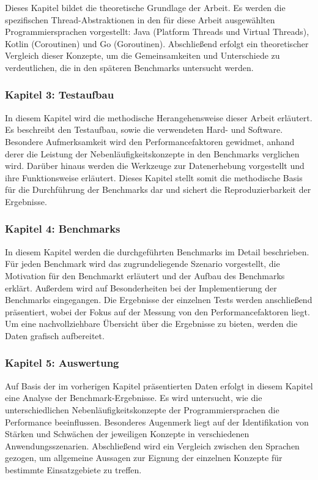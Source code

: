 \documentclass[fontsize=12pt,paper=a4,twoside=semi,parskip=half-,headsepline,headinclude]{scrreprt}
\begin{document}
Dieses Kapitel bildet die theoretische Grundlage der Arbeit. Es werden die spezifischen Thread-Abstraktionen in den für diese Arbeit ausgewählten Programmiersprachen vorgestellt: Java (Platform Threads und Virtual Threads), Kotlin (Coroutinen) und Go (Goroutinen). Abschließend erfolgt ein theoretischer Vergleich dieser Konzepte, um die Gemeinsamkeiten und Unterschiede zu verdeutlichen, die in den späteren Benchmarks untersucht werden.

\subsubsection{Kapitel 3: Testaufbau}

In diesem Kapitel wird die methodische Herangehensweise dieser Arbeit erläutert. Es beschreibt den Testaufbau, sowie die verwendeten Hard- und Software. Besondere Aufmerksamkeit wird den Performancefaktoren gewidmet, anhand derer die Leistung der Nebenläufigkeitskonzepte in den Benchmarks verglichen wird. Darüber hinaus werden die Werkzeuge zur Datenerhebung vorgestellt und ihre Funktionsweise erläutert. Dieses Kapitel stellt somit die methodische Basis für die Durchführung der Benchmarks dar und sichert die Reproduzierbarkeit der Ergebnisse.

\subsubsection{Kapitel 4: Benchmarks}

In diesem Kapitel werden die durchgeführten Benchmarks im Detail beschrieben. Für jeden Benchmark wird das zugrundeliegende Szenario vorgestellt, die Motivation für den Benchmarkt erläutert und der Aufbau des Benchmarks erklärt. Außerdem wird auf Besonderheiten bei der Implementierung der Benchmarks eingegangen. Die Ergebnisse der einzelnen Tests werden anschließend präsentiert, wobei der Fokus auf der Messung von den Performancefaktoren liegt. Um eine nachvollziehbare Übersicht über die Ergebnisse zu bieten, werden die Daten grafisch aufbereitet.

\subsubsection{Kapitel 5: Auswertung}

Auf Basis der im vorherigen Kapitel präsentierten Daten erfolgt in diesem Kapitel eine Analyse der Benchmark-Ergebnisse. Es wird untersucht, wie die unterschiedlichen Nebenläufigkeitskonzepte der Programmiersprachen die Performance beeinflussen. Besonderes Augenmerk liegt auf der Identifikation von Stärken und Schwächen der jeweiligen Konzepte in verschiedenen Anwendungsszenarien. Abschließend wird ein Vergleich zwischen den Sprachen gezogen, um allgemeine Aussagen zur Eignung der einzelnen Konzepte für bestimmte Einsatzgebiete zu treffen.
\end{document}
